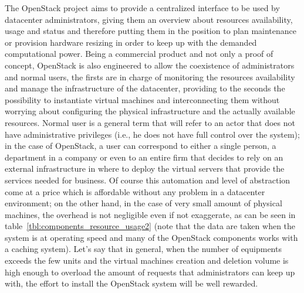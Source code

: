 The OpenStack project aims to provide a centralized interface to be used by datacenter administrators, giving them an overview about resources availability, usage and status and therefore putting them in the position to plan maintenance or provision hardware resizing in order to keep up with the demanded computational power.
Being a commercial product and not only a proof of concept, OpenStack is also engineered to allow the coexistence of administrators and normal users, the firsts are in charge of monitoring the resources availability and manage the infrastructure of the datacenter, providing to the seconds the possibility to instantiate virtual machines and interconnecting them without worrying about configuring the physical infrastructure and the actually available resources.
Normal user is a general term that will refer to an actor that does not have administrative privileges (i.e., he does not have full control over the system); in the case of OpenStack, a user can correspond to either a single person, a department in a company or even to an entire firm that decides to rely on an external infrastructure in where to deploy the virtual servers that provide the services needed for business.
Of course this automation and level of abstraction come at a price which is affordable without any problem in a datacenter environment; on the other hand, in the case of very small amount of physical machines, the overhead is not negligible even if not exaggerate, as can be seen in table~\ref{tbl:components_resource_usage2} (note that the data are taken when the system is at operating speed and many of the OpenStack components works with a caching system). %
Let's say that in general, when the number of equipments exceeds the few units and the virtual machines creation and deletion volume is high enough to overload the amount of requests that administrators can keep up with, the effort to install the OpenStack system will be well rewarded.

